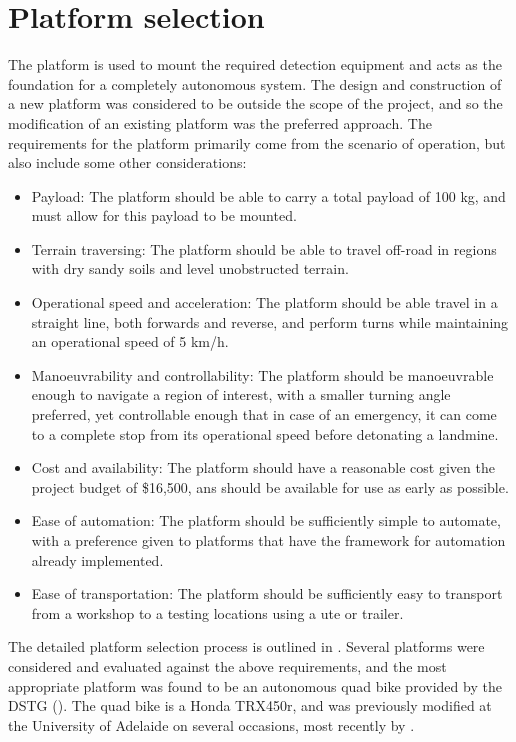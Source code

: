 \documentclass[main.tex]{subfiles}
\begin{document}
\section{Platform selection}
The platform is used to mount the required detection equipment and acts as the foundation for a completely autonomous system. The design and construction of a new platform was considered to be outside the scope of the project, and so the modification of an existing platform was the preferred approach. The requirements for the platform primarily come from the scenario of operation, but also include some other considerations: 

\begin{itemize}
 \item Payload: The platform should be able to carry a total payload of 100 kg, and must allow for this payload to be mounted.
 \item Terrain traversing: The platform should be able to travel off-road in regions with dry sandy soils and level unobstructed terrain.
\item  Operational speed and acceleration: The platform should be able travel in a straight line, both forwards and reverse, and perform turns while maintaining an operational speed of 5 km/h.
\item Manoeuvrability and controllability: The platform should be manoeuvrable enough to navigate a region of interest, with a smaller turning angle preferred, yet controllable enough that in case of an emergency, it can come to a complete stop from its operational speed before detonating a landmine.
\item Cost and availability: The platform should have a reasonable cost given the project budget of \$16,500, ans should be available for use as early as possible. 
\item Ease of automation: The platform should be sufficiently simple to automate, with a preference given to platforms that have the framework for automation already implemented. 
\item Ease of transportation: The platform should be sufficiently easy to transport from a workshop to a testing locations using a ute or trailer.
\end{itemize}

The detailed platform selection process is outlined in . Several platforms were considered and evaluated against the above requirements, and the most appropriate platform was found to be an autonomous quad bike provided by the DSTG (). The quad bike is a Honda TRX450r, and was previously modified at the University of Adelaide on several occasions, most recently by \textcite{scheiner2011}. 
\end{document}
